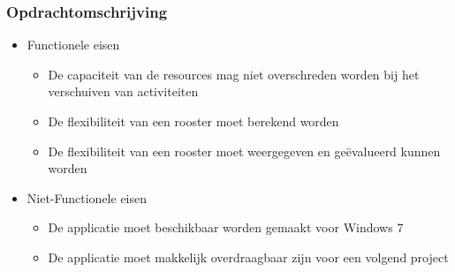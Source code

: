 \begin{frame}\frametitle{Opdrachtomschrijving}
	\begin{itemize}
		\item Functionele eisen
		\begin{itemize}
			\item De capaciteit van de resources mag niet overschreden worden bij het verschuiven van activiteiten
			\item De flexibiliteit van een rooster moet berekend worden
			\item De flexibiliteit van een rooster moet weergegeven en geëvalueerd kunnen worden
		\end{itemize}
		\item Niet-Functionele eisen
		\begin{itemize}
			\item De applicatie moet beschikbaar worden gemaakt voor Windows 7
			\item De applicatie moet makkelijk overdraagbaar zijn voor een volgend project
		\end{itemize}
	\end{itemize}
\end{frame}